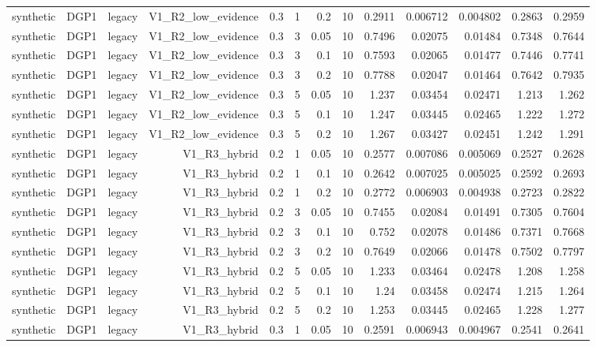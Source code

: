 \begin{table}[htbp]
\begin{tabular}{lrrrrrrrrrrrr}
    synthetic & DGP1 & legacy & V1\_R2\_low\_evidence & 0.3 & 1 & 0.2 & 10 & 0.2911 & 0.006712 & 0.004802 & 0.2863 & 0.2959 \\
    synthetic & DGP1 & legacy & V1\_R2\_low\_evidence & 0.3 & 3 & 0.05 & 10 & 0.7496 & 0.02075 & 0.01484 & 0.7348 & 0.7644 \\
    synthetic & DGP1 & legacy & V1\_R2\_low\_evidence & 0.3 & 3 & 0.1 & 10 & 0.7593 & 0.02065 & 0.01477 & 0.7446 & 0.7741 \\
    synthetic & DGP1 & legacy & V1\_R2\_low\_evidence & 0.3 & 3 & 0.2 & 10 & 0.7788 & 0.02047 & 0.01464 & 0.7642 & 0.7935 \\
    synthetic & DGP1 & legacy & V1\_R2\_low\_evidence & 0.3 & 5 & 0.05 & 10 & 1.237 & 0.03454 & 0.02471 & 1.213 & 1.262 \\
    synthetic & DGP1 & legacy & V1\_R2\_low\_evidence & 0.3 & 5 & 0.1 & 10 & 1.247 & 0.03445 & 0.02465 & 1.222 & 1.272 \\
    synthetic & DGP1 & legacy & V1\_R2\_low\_evidence & 0.3 & 5 & 0.2 & 10 & 1.267 & 0.03427 & 0.02451 & 1.242 & 1.291 \\
    synthetic & DGP1 & legacy & V1\_R3\_hybrid & 0.2 & 1 & 0.05 & 10 & 0.2577 & 0.007086 & 0.005069 & 0.2527 & 0.2628 \\
    synthetic & DGP1 & legacy & V1\_R3\_hybrid & 0.2 & 1 & 0.1 & 10 & 0.2642 & 0.007025 & 0.005025 & 0.2592 & 0.2693 \\
    synthetic & DGP1 & legacy & V1\_R3\_hybrid & 0.2 & 1 & 0.2 & 10 & 0.2772 & 0.006903 & 0.004938 & 0.2723 & 0.2822 \\
    synthetic & DGP1 & legacy & V1\_R3\_hybrid & 0.2 & 3 & 0.05 & 10 & 0.7455 & 0.02084 & 0.01491 & 0.7305 & 0.7604 \\
    synthetic & DGP1 & legacy & V1\_R3\_hybrid & 0.2 & 3 & 0.1 & 10 & 0.752 & 0.02078 & 0.01486 & 0.7371 & 0.7668 \\
    synthetic & DGP1 & legacy & V1\_R3\_hybrid & 0.2 & 3 & 0.2 & 10 & 0.7649 & 0.02066 & 0.01478 & 0.7502 & 0.7797 \\
    synthetic & DGP1 & legacy & V1\_R3\_hybrid & 0.2 & 5 & 0.05 & 10 & 1.233 & 0.03464 & 0.02478 & 1.208 & 1.258 \\
    synthetic & DGP1 & legacy & V1\_R3\_hybrid & 0.2 & 5 & 0.1 & 10 & 1.24 & 0.03458 & 0.02474 & 1.215 & 1.264 \\
    synthetic & DGP1 & legacy & V1\_R3\_hybrid & 0.2 & 5 & 0.2 & 10 & 1.253 & 0.03445 & 0.02465 & 1.228 & 1.277 \\
    synthetic & DGP1 & legacy & V1\_R3\_hybrid & 0.3 & 1 & 0.05 & 10 & 0.2591 & 0.006943 & 0.004967 & 0.2541 & 0.2641 \\

\end{tabular}
\end{table}
